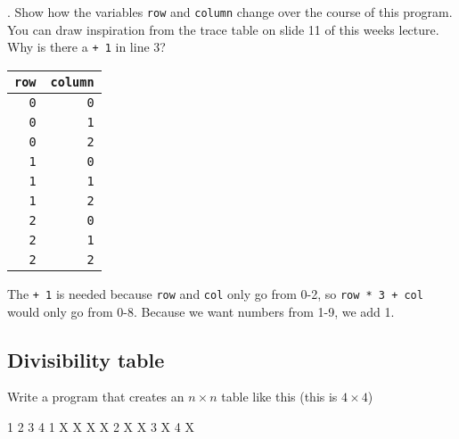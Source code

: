 \vspace{1em}

. Show how the variables \texttt{row} and \texttt{column} change over the course of this program. You can draw inspiration from the trace table on slide 11 of this weeks lecture. Why is there a \texttt{+ 1} in line 3?

\vspace{1em}

\begin{solution}

    \begin{center}
        \begin{tabular}{r r}
            \textbf{\texttt{row}} & \textbf{\texttt{column}} \\
            \hline \hline
            \texttt{0} & \texttt{0} \\
            \texttt{0} & \texttt{1} \\
            \texttt{0} & \texttt{2} \\
            \texttt{1} & \texttt{0} \\
            \texttt{1} & \texttt{1} \\
            \texttt{1} & \texttt{2} \\
            \texttt{2} & \texttt{0} \\
            \texttt{2} & \texttt{1} \\
            \texttt{2} & \texttt{2} \\
            \hline
        \end{tabular}
    \end{center}

    \noindent The \texttt{+ 1} is needed because \texttt{row} and \texttt{col} only go from 0-2, so \texttt{row * 3 + col} would only go from 0-8. Because we want numbers from 1-9, we add 1.
\end{solution}

\subsection{Divisibility table}

\noindent Write a program that creates an $n \times n$ table like this (this is $4 \times 4$)

\begin{outputcode}
       1   2   3   4
   1   X   X   X   X
   2       X       X
   3           X
   4               X
\end{outputcode}

